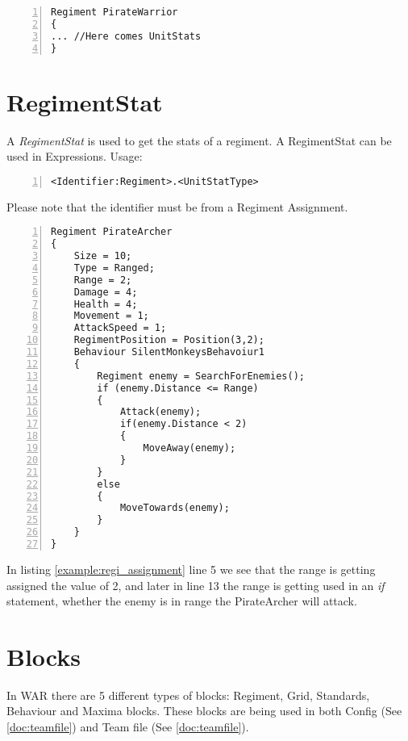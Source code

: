 		\begin{lstlisting}[basicstyle=\small\sffamily, keywordstyle={\color{blue}}, comment={[l]{//}}, morecomment={[s]{/*}{*/}}, commentstyle=\itshape, columns={[l]flexible}, numbers=left, numberstyle=\tiny, frameround=fftt, frame=shadowbox, captionpos=b,
		caption={Example of a regiment assignment}]
Regiment PirateWarrior
{
... //Here comes UnitStats
}
		\end{lstlisting}
		

\section{RegimentStat}
	A {\it RegimentStat} is used to get the stats of a regiment. A RegimentStat can be used in Expressions. Usage:\\

		\begin{lstlisting}[basicstyle=\small\sffamily,
		keywordstyle={\color{blue}},
		comment={[l]{//}}, morecomment={[s]{/*}{*/}}, commentstyle=\itshape,
		columns={[l]flexible}, numbers=left, numberstyle=\tiny,
		frameround=fftt, frame=shadowbox, captionpos=b,
		caption={Regiment Stat}]
<Identifier:Regiment>.<UnitStatType>
	\end{lstlisting}
	Please note that the identifier must be from a Regiment Assignment.

		\begin{lstlisting}[basicstyle=\small\sffamily,
		keywordstyle={\color{blue}},
		comment={[l]{//}}, morecomment={[s]{/*}{*/}}, commentstyle=\itshape,
		columns={[l]flexible}, numbers=left, numberstyle=\tiny,
		frameround=fftt, frame=shadowbox, captionpos=b,
		caption={Example of an assignment in use}
		label={example:regi_assignment}]
Regiment PirateArcher
{
	Size = 10;
	Type = Ranged;
	Range = 2;
	Damage = 4;
	Health = 4;
	Movement = 1;
	AttackSpeed = 1;
	RegimentPosition = Position(3,2);
	Behaviour SilentMonkeysBehavoiur1
	{
		Regiment enemy = SearchForEnemies();
		if (enemy.Distance <= Range)
		{
			Attack(enemy);
			if(enemy.Distance < 2)
			{
				MoveAway(enemy);
			}
		}
		else
		{
			MoveTowards(enemy);
		}
	}
}
\end{lstlisting}
In listing \ref{example:regi_assignment} line 5 we see that the range is getting assigned the value of 2, and later in line 13 the range is getting used in an \textit{if} statement, whether the enemy is in range the PirateArcher will attack.

\section{Blocks}
\label{doc:blocks}
	In WAR there are 5 different types of blocks: Regiment, Grid, Standards, Behaviour and Maxima blocks. 
	These blocks are being used in both Config (See \ref{doc:teamfile}) and Team file (See \ref{doc:teamfile}).
